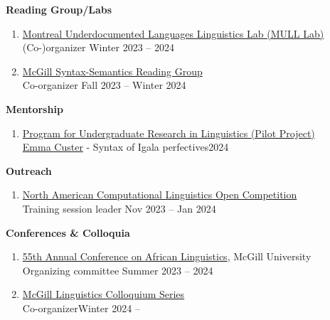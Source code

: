 \documentclass[margin,line]{resume}
\begin{document}
\begin{resume}

	\textbf{Reading Group/Labs}
	\begin{enumerate}[-, leftmargin=1em, topsep=4pt]
		\item[] \href{https://mcling.blogs.mcgill.ca/category/mull-lab/}{Montreal Underdocumented Languages Linguistics Lab (MULL Lab)}\\
		      \hphantom{...}(Co-)organizer \hfill Winter 2023 -- 2024

		\item[] \href{https://mcling.blogs.mcgill.ca/category/syntax-semantics-group/}{McGill Syntax-Semantics Reading Group}\\
		      \hphantom{...}Co-organizer \hfill Fall 2023 -- Winter 2024
	\end{enumerate}

	\textbf{Mentorship}
	\begin{enumerate}[-, leftmargin=1em, topsep=4pt]
		\item[] \href{https://www.mcgill.ca/cogsci/research/cogs396}{Program for Undergraduate Research in Linguistics (Pilot Project)}\\
		      \hphantom{...}\href{https://www.linkedin.com/in/emma-custer-648345252}{Emma Custer} - Syntax of Igala perfectives\hfill 2024
	\end{enumerate}

	\textbf{Outreach}
	\begin{enumerate}[-, leftmargin=1em, topsep=4pt]
		\item[] \href{https://naclo.org/}{North American Computational Linguistics Open Competition}\\
		      \hphantom{...}Training session leader \hfill Nov 2023 -- Jan 2024
	\end{enumerate}

	\textbf{Conferences \& Colloquia}
	\begin{enumerate}[-, leftmargin=1em, topsep=4pt]
		\item[] \href{https://acal55.mull-lab.org/}{55th Annual Conference on African Linguistics}, McGill University\\
		      \hphantom{...}Organizing committee \hfill Summer 2023 -- 2024

		\item[] \href{https://www.mcgill.ca/linguistics/events/colloquium-series}{McGill Linguistics Colloquium Series}\\
		      \hphantom{...}Co-organizer\hfill Winter 2024 --
	\end{enumerate}


\end{resume}
\end{document}
